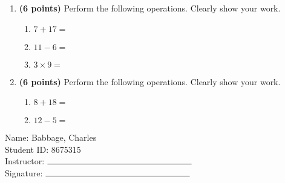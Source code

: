 \documentclass[12pt]{amsart}
\begin{document}
\newpage
\begin{enumerate}
\item {\bf (6 points)} 
 Perform the following operations. Clearly show your work. \begin{enumerate}


\def \a{7}\def \b{17}\def \apb{24}

 
\item $\a + \b = $

\vspace{2cm}
\def \a{11}\def \dif{5}\def \b{6}

 
\item $\a - \b = $

\vspace{2cm}
\def \a{3}\def \b{9}\def \ab{12}

 
\item $\a \times \b = $ 

\vspace{2cm}
\def \vshift{-5}\def \hshift{-2}\def \chang{0}\def \findval{-2}\def \yval{-5}

 
\end{enumerate}


\newpage
\item {\bf (6 points)} 
 Perform the following operations. Clearly show your work. \begin{enumerate}


\def \a{8}\def \b{18}\def \apb{26}

 
\item $\a + \b = $

\vspace{2cm}
\def \a{12}\def \dif{7}\def \b{5}

 
\item $\a - \b = $

\vspace{2cm}
\def \vshift{-5}\def \hshift{2}\def \chang{2}\def \findval{4}\def \yval{-9}

 
\end{enumerate}


\newpage\end{enumerate}\graphicspath{{C:/Users/iainc/anaconda3/Randomizer/Sample Course/Sample Assessment 2/}}\setcounter{page}{1}


\thispagestyle{fancy}

 \noindent Name: Babbage, Charles \vspace{.3cm} \\\noindent Student ID: 8675315 \vspace{.3cm} \\\noindent Instructor: $\rule{6cm}{0.15mm}$ \vspace{.3cm} \\\noindent Signature: $\rule{6cm}{0.15mm}$ \vspace{.3cm} \\ 
\end{document}

